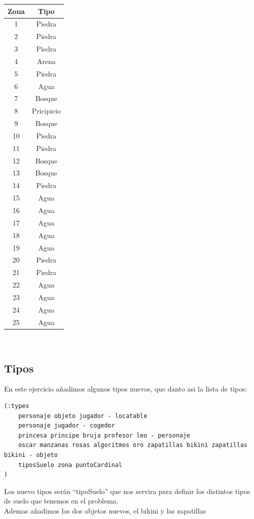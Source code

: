 \documentclass[12pt,a4paper]{article}
\begin{document}
\begin{tabular}{|c|c|}
	\hline 
	Zona & Tipo \\ 
	\hline 
	1 & Piedra \\ 
	\hline 
	2 & Piedra \\ 
	\hline 
	3 & Piedra \\ 
	\hline 
	4 & Arena \\ 
	\hline 
	5 & Piedra \\ 
	\hline 
	6 & Agua \\ 
	\hline 
	7 & Bosque \\ 
	\hline 
	8 & Pricipicio \\ 
	\hline 
	9 & Bosque \\ 
	\hline 
	10 & Piedra \\ 
	\hline 
	11 & Piedra \\ 
	\hline 
	12 & Bosque \\ 
	\hline 
	13 & Bosque \\ 
	\hline 
	14 & Piedra \\ 
	\hline 
	15 & Agua \\ 
	\hline 
	16 & Agua \\ 
	\hline 
	17 & Agua \\ 
	\hline 
	18 & Agua \\ 
	\hline 
	19 & Agua \\ 
	\hline 
	20 & Piedra \\ 
	\hline 
	21 & Piedra \\ 
	\hline 
	22 & Agua \\ 
	\hline 
	23 & Agua \\ 
	\hline 
	24 & Agua \\ 
	\hline 
	25 & Agua \\ 
	\hline 
\end{tabular}\\

\subsection{Tipos}
En este ejercicio añadimos algunos tipos nuevos, que danto asi la lista de tipos:
\begin{lstlisting}
(:types  
	personaje objeto jugador - locatable
	personaje jugador - cogedor
	princesa principe bruja profesor leo - personaje
	oscar manzanas rosas algoritmos oro zapatillas bikini zapatillas bikini - objeto
	tiposSuelo zona puntoCardinal
)
\end{lstlisting}
Los nuevo tipos serán ``tipoSuelo'' que nos servira para definir los distintos tipos de suelo que tenemos en el problema.\\
Ademas añadimos los dos objetos nuevos, el bikini y las zapatillas
\end{document}
